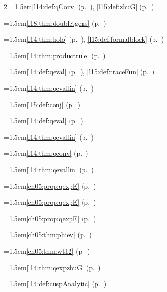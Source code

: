 \begin{multicols}{2}
\hangindent=1.5em\quad \ref{l14:def:qConv} (p.~\pageref{l14:def:qConv}), \ref{l15:def:zhuG} (p.~\pageref{l15:def:zhuG})\par
\hangindent=1.5em\quad \ref{l18:thm:doubletgens} (p.~\pageref{l18:thm:doubletgens})\par
\hangindent=1.5em\quad \ref{l14:thm:holo} (p.~\pageref{l14:thm:holo}), \ref{l15:def:formalblock} (p.~\pageref{l15:def:formalblock})\par
\hangindent=1.5em\quad \ref{l14:thm:productrule} (p.~\pageref{l14:thm:productrule})\par
\hangindent=1.5em\quad \ref{l14:def:qeval} (p.~\pageref{l14:def:qeval}), \ref{l15:def:traceFun} (p.~\pageref{l15:def:traceFun})\par
\hangindent=1.5em\quad \ref{l14:thm:qevallin} (p.~\pageref{l14:thm:qevallin})\par
\hangindent=1.5em\quad \ref{l15:def:conj} (p.~\pageref{l15:def:conj})\par
\hangindent=1.5em\quad \ref{l14:def:qeval} (p.~\pageref{l14:def:qeval})\par
\hangindent=1.5em\quad \ref{l14:thm:qevallin} (p.~\pageref{l14:thm:qevallin})\par
\hangindent=1.5em\quad \ref{l14:thm:qconv} (p.~\pageref{l14:thm:qconv})\par
\hangindent=1.5em\quad \ref{l14:thm:qevallin} (p.~\pageref{l14:thm:qevallin})\par
\hangindent=1.5em\quad \ref{ch05:prop:qexpE} (p.~\pageref{ch05:prop:qexpE})\par
\hangindent=1.5em\quad \ref{ch05:prop:qexpE} (p.~\pageref{ch05:prop:qexpE})\par
\hangindent=1.5em\quad \ref{ch05:prop:qexpE} (p.~\pageref{ch05:prop:qexpE})\par
\hangindent=1.5em\quad \ref{ch05:thm:phiev} (p.~\pageref{ch05:thm:phiev})\par
\hangindent=1.5em\quad \ref{ch05:thm:wt12} (p.~\pageref{ch05:thm:wt12})\par
\hangindent=1.5em\quad \ref{l14:thm:qexpzhuG} (p.~\pageref{l14:thm:qexpzhuG})\par
\hangindent=1.5em\quad \ref{l14:def:cuspAnalytic} (p.~\pageref{l14:def:cuspAnalytic})\par

\end{multicols}
